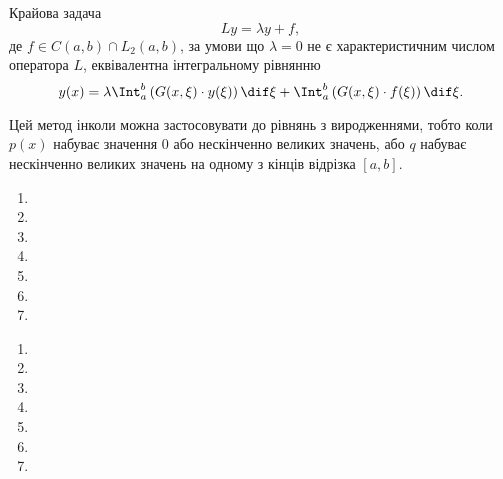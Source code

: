 Крайова задача  \[Ly = \lambda y + f,\] де $f \in C(a, b)\cap L_2(a,b)$, за умови що $\lambda = 0$ не є характеристичним числом оператора $L$, еквівалентна інтегральному рівнянню
\[ y(x) = \lambda \Int_a^b \left(G(x, \xi) \cdot y(\xi)\right) \dif \xi + \Int_a^b \left(G(x, \xi) \cdot f(\xi)\right) \dif \xi.\]

Цей метод інколи можна застосовувати до рівнянь з виродженнями, тобто коли $p(x)$ набуває значення $0$ або нескінченно великих значень, або $q$ набуває нескінченно великих значень на одному з кінців відрізка $[a,b]$.

\begin{problem}[15.14 Владіміров]
	\begin{enumerate}
		\item 
		\item 
		\item 
		\item 
		\item 
		\item 
		\item 
	\end{enumerate}
\end{problem}

\begin{solution}
	\begin{enumerate}
		\item 
		\item 
		\item 
		\item 
		\item 
		\item 
		\item 
	\end{enumerate}
\end{solution}
